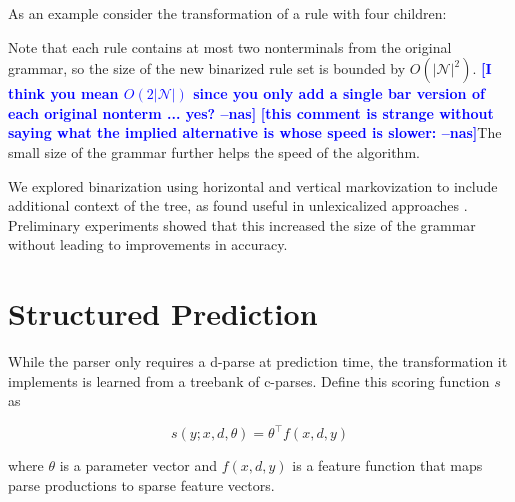 \documentclass[11pt,letterpaper]{article}
\newcommand{\nonterms}{\mathcal{N}}
\newcommand{\lpkcomment}[1]{\textcolor{red}{\bf \small [#1 --lpk]}}
\newcommand{\nascomment}[1]{\textcolor{blue}{\bf \small [#1 --nas]}}
\begin{document}
\noindent As an example consider the transformation of a rule with four children:

\begin{center}
\end{center}

Note that each rule contains at most two nonterminals from the
original grammar, so the size of the new binarized rule set is bounded
by $O(|\nonterms|^2)$.  \nascomment{I think you mean $O(2|\nonterms|)$
  since you only add a single bar version of each original nonterm
  ... yes?}  \nascomment{this comment is strange without saying what
  the implied alternative is whose speed is slower: }The small size of the grammar further helps the speed of the algorithm.

We explored binarization using horizontal and vertical markovization to include additional context 
of the tree,  as found useful in unlexicalized approaches
\cite{klein2003accurate}.  Preliminary experiments showed that this increased the size of the grammar without leading to improvements in accuracy.






\section{Structured Prediction}
\label{sec:strpred}
While the parser only requires a d-parse at prediction time, 
the transformation it implements is learned from a treebank of c-parses.
Define this scoring function $s$ as 

\[s(y;x, d, \theta) =  \theta^{\top} f(x, d, y) \]

\noindent
where $\theta$ is a parameter vector and $f(x, d, y)$ is a feature
function that maps parse productions to sparse feature vectors. 
\end{document}
